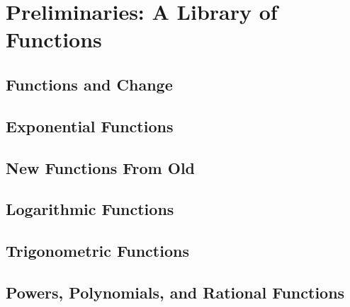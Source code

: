 
\chapter{Preliminaries: A Library of Functions}\minitoc
\section{Functions and Change}


\section{Exponential Functions}



\section{New Functions From Old}


\section{Logarithmic Functions}


\section{Trigonometric Functions}


\section{Powers, Polynomials, and Rational Functions}


